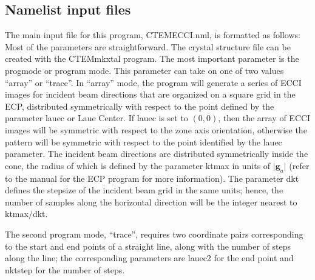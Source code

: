 \documentclass[DIV=calc, paper=letter, fontsize=11pt]{scrartcl}	 %
\begin{document}
\subsection{Namelist input files\label{sec:f90inputecp}}
The main input file for this program, \textsf{CTEMECCI.nml}, is formatted as follows:
Most of the parameters are straightforward.  The crystal structure file can be created with 
the \textsf{CTEMmkxtal} program.  The most important parameter is the \textsf{progmode} or program mode.  This
parameter can take on one of two values ``array'' or ``trace''.  In ``array'' mode, the program will generate a series of 
ECCI images for incident beam directions that are organized on a square grid in the ECP, distributed symmetrically with
respect to the point defined by the parameter \textsf{lauec} or Laue Center.  If \textsf{lauec} is set to $(0,0)$, then the array
of ECCI images will be symmetric with respect to the zone axis orientation, otherwise the pattern will be symmetric with 
respect to the point identified by the \textsf{lauec} parameter.  The incident beam directions are distributed symmetrically inside the cone,
the radius of which is defined by the parameter \textsf{ktmax} in units of $\vert\mathbf{g}_a\vert$ (refer to the manual for the 
ECP program for more information).  The parameter \textsf{dkt} defines the stepsize of the incident beam grid in the same
units; hence, the number of samples along the horizontal direction will be the integer nearest to \textsf{ktmax}$/$\textsf{dkt}.

The second program mode, ``trace'', requires two coordinate pairs corresponding to the start and end points of a straight line,
along with the number of steps along the line; the corresponding parameters are \textsf{lauec2} for the end point and \textsf{nktstep}
for the number of steps.  
\end{document}
